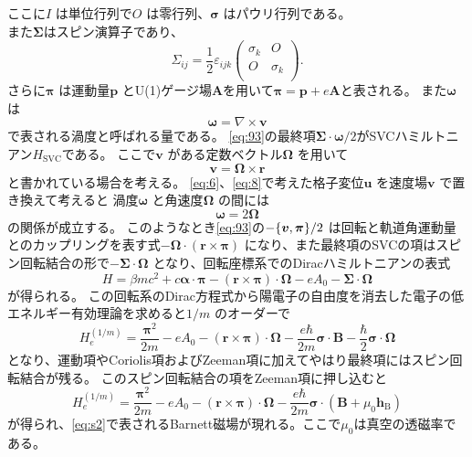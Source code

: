 \documentclass[dvipdfmx]{jsreport}
\numberwithin{equation}{chapter}
\numberwithin{table}{chapter}
\begin{document}
ここに$I$ は単位行列で$O$ は零行列、$\bm{\sigma}$ はパウリ行列である。
\\また$\bm{\Sigma}$はスピン演算子であり、
\begin{equation}
\label{eq:95}
\Sigma_{ij}=\frac{1}{2}\varepsilon_{ijk}\begin{pmatrix} \sigma_k & O\\O&\sigma_k\\ \end{pmatrix} 
.\end{equation}
さらに$\bm{\pi }$ は運動量$\bm{p}$ とU(1)ゲージ場$\bm{A}$を用いて$\bm{\pi }=\bm{p}+e\bm{A}$と表される。
また$\bm{\omega}$ は
\begin{equation}
\label{eq:96}
	\bm{\omega}=\nabla \times \bm{v}
\end{equation}
で表される渦度と呼ばれる量である。
\eqref{eq:93}の最終項$\bm{\Sigma}\cdot \bm{\omega} /2$がSVCハミルトニアン$H_\text{SVC} $である。
ここで$\bm{v}$ がある定数ベクトル$\bm{\Omega}$ を用いて
\begin{equation}
\label{eq:97}
	\bm{v}=\bm{\Omega}\times \bm{r}
\end{equation}
と書かれている場合を考える。
\eqref{eq:6}、\eqref{eq:8}で考えた格子変位$\bm{u}$ を速度場$\bm{v}$ で置き換えて考えると
渦度$\bm{\omega}$ と角速度$\bm{\Omega}$ の間には
\begin{equation}
\label{eq:98}
	\bm{\omega} = 2\bm{\Omega}
\end{equation}
の関係が成立する。
このようなとき\eqref{eq:93}の$-\acomm{\bm{v}}{\bm{\pi }} /2$ は回転と軌道角運動量とのカップリングを表す式$-\bm{\Omega}\cdot (\bm{r}\times \bm{\pi })$ になり、また最終項のSVCの項はスピン回転結合の形で$-\bm{\Sigma}\cdot \bm{\Omega}$ となり、回転座標系でのDiracハミルトニアンの表式
\begin{equation}
\label{eq:99}
	H=\beta mc^2+c \bm{\alpha}\cdot \bm{\pi }-(\bm{r}\times \bm{\pi })\cdot \bm{\Omega}-eA_0-\bm{\Sigma}\cdot \bm{\Omega}
\end{equation}
が得られる。
この回転系のDirac方程式から陽電子の自由度を消去した電子の低エネルギー有効理論を求めると$1 /m$ のオーダーで
\begin{equation}
\label{eq:100}
	H^{(1 /m)}_e=\frac{\bm{\pi}^2}{2m}-eA_0-(\bm{r}\times \bm{\pi })\cdot \bm{\Omega}-\frac{e\hbar }{2m}\bm{\sigma}\cdot \bm{B}-\frac{\hbar}{2}\bm{\sigma}\cdot  \bm{\Omega}
\end{equation}
となり、運動項やCoriolis項およびZeeman項に加えてやはり最終項にはスピン回転結合が残る。
このスピン回転結合の項をZeeman項に押し込むと
\begin{equation}
\label{eq:101}
H^{(1 /m)}_e=\frac{\bm{\pi}^2}{2m}-eA_0-(\bm{r}\times \bm{\pi })\cdot \bm{\Omega}-\frac{e\hbar }{2m}\bm{\sigma}\cdot (\bm{B}+\mu_0 \bm{h}_\text{B})
\end{equation}
が得られ、\eqref{eq:s2}で表されるBarnett磁場が現れる。ここで$\mu_0$は真空の透磁率である。
\end{document}
